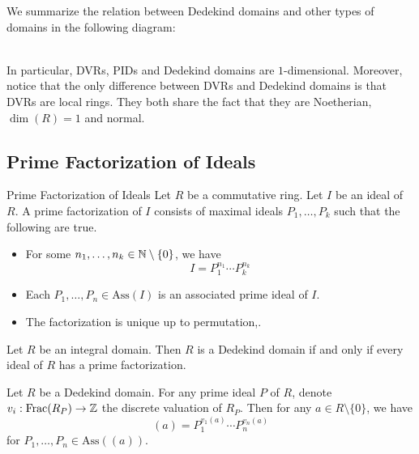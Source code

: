\documentclass[a4paper]{article}
\begin{document}
We summarize the relation between Dedekind domains and other types of domains in the following diagram: 

 \\

In particular, DVRs, PIDs and Dedekind domains are $1$-dimensional. Moreover, notice that the only difference between DVRs and Dedekind domains is that DVRs are local rings. They both share the fact that they are Noetherian, $\dim(R)=1$ and normal. 

\subsection{Prime Factorization of Ideals}
\begin{defn}{Prime Factorization of Ideals}{} Let $R$ be a commutative ring. Let $I$ be an ideal of $R$. A prime factorization of $I$ consists of maximal ideals $P_1,\dots,P_k$ such that the following are true. 
\begin{itemize}
\item For some $n_1,\dots,n_k\in\mathbb{N}\setminus\{0\}$, we have $$I=P_1^{n_1}\cdots P_k^{n_k}$$
\item Each $P_1,\dots,P_n\in\text{Ass}(I)$ is an associated prime ideal of $I$. 
\item The factorization is unique up to permutation,. 
\end{itemize}
\end{defn}

\begin{prp}{}{} Let $R$ be an integral domain. Then $R$ is a Dedekind domain if and only if every ideal of $R$ has a prime factorization. 
\end{prp}

\begin{prp}{}{} Let $R$ be a Dedekind domain. For any prime ideal $P$ of $R$, denote $v_i:\text{Frac}(R_P)\to\mathbb{Z}$ the discrete valuation of $R_P$. Then for any $a\in R\setminus\{0\}$, we have $$(a)=P_1^{v_1(a)}\cdots P_n^{v_n(a)}$$ for $P_1,\dots,P_n\in\text{Ass}((a))$. 
\end{prp}
\end{document}
